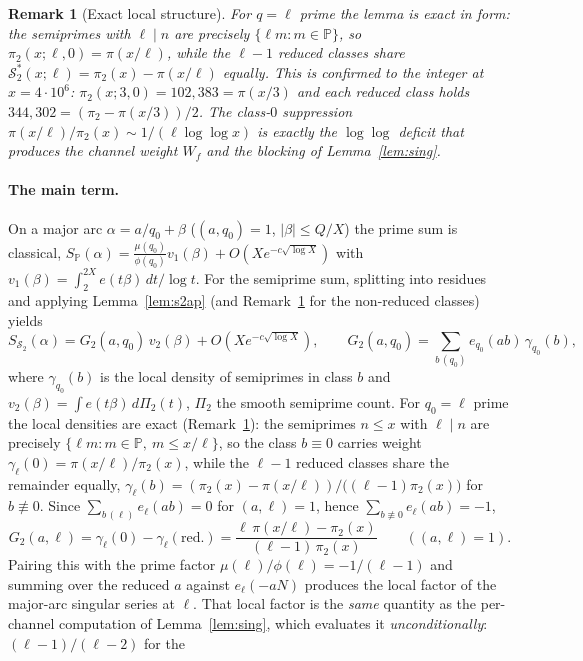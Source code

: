 \documentclass[]{interact}%
\newtheorem{remark}{Remark}
\newcommand{\PP}{\mathbb P}
\newcommand{\SSemi}{\mathcal S_2}
\begin{document}
\begin{remark}[Exact local structure]\label{rem:exact}
For $q=\ell$ prime the lemma is exact in form: the semiprimes with $\ell\mid n$ are
precisely $\{\ell m:m\in\PP\}$, so $\pi_2(x;\ell,0)=\pi(x/\ell)$, while the
$\ell-1$ reduced classes share $\SSemi^*(x;\ell)=\pi_2(x)-\pi(x/\ell)$ equally. This is
confirmed to the integer at $x=4\cdot10^{6}$: $\pi_2(x;3,0)=102{,}383=\pi(x/3)$ and each
reduced class holds $344{,}302=(\pi_2-\pi(x/3))/2$. The class-$0$ suppression
$\pi(x/\ell)/\pi_2(x)\sim 1/(\ell\log\log x)$ is exactly the $\log\log$ deficit that
produces the channel weight $W_f$ and the blocking of Lemma~\ref{lem:sing}.
\end{remark}

\paragraph{The main term.}
On a major arc $\alpha=a/q_0+\beta$ ($(a,q_0)=1$, $|\beta|\le Q/X$) the prime sum is
classical, $S_\PP(\alpha)=\frac{\mu(q_0)}{\phi(q_0)}v_1(\beta)+O(X e^{-c\sqrt{\log X}})$
with $v_1(\beta)=\int_2^{2X}e(t\beta)\,dt/\log t$. For the semiprime sum, splitting into
residues and applying Lemma~\ref{lem:s2ap} (and Remark~\ref{rem:exact} for the
non-reduced classes) yields
\[
  S_{\SSemi}(\alpha)=G_2(a,q_0)\,v_2(\beta)+O(Xe^{-c\sqrt{\log X}}),\qquad
  G_2(a,q_0)=\sum_{b\,(q_0)}e_{q_0}(ab)\,\gamma_{q_0}(b),
\]
where $\gamma_{q_0}(b)$ is the local density of semiprimes in class $b$ and
$v_2(\beta)=\int e(t\beta)\,d\Pi_2(t)$, $\Pi_2$ the smooth semiprime count. For $q_0=\ell$ prime
the local densities are exact (Remark~\ref{rem:exact}): the semiprimes $n\le x$ with $\ell\mid n$
are precisely $\{\ell m:m\in\PP,\ m\le x/\ell\}$, so the class $b\equiv0$ carries weight
$\gamma_\ell(0)=\pi(x/\ell)/\pi_2(x)$, while the $\ell-1$ reduced classes share the remainder
equally, $\gamma_\ell(b)=(\pi_2(x)-\pi(x/\ell))/\big((\ell-1)\pi_2(x)\big)$ for $b\not\equiv0$.
Since $\sum_{b\,(\ell)}e_\ell(ab)=0$ for $(a,\ell)=1$, hence $\sum_{b\not\equiv0}e_\ell(ab)=-1$,
\[
  G_2(a,\ell)=\gamma_\ell(0)-\gamma_\ell(\mathrm{red.})
  =\frac{\ell\,\pi(x/\ell)-\pi_2(x)}{(\ell-1)\,\pi_2(x)}\qquad((a,\ell)=1).
\]
Pairing this with the prime factor $\mu(\ell)/\phi(\ell)=-1/(\ell-1)$ and summing over the reduced
$a$ against $e_\ell(-aN)$ produces the local factor of the major-arc singular series at $\ell$.
That local factor is the \emph{same} quantity as the per-channel computation of
Lemma~\ref{lem:sing}, which evaluates it \emph{unconditionally}: $(\ell-1)/(\ell-2)$ for the
\end{document}

